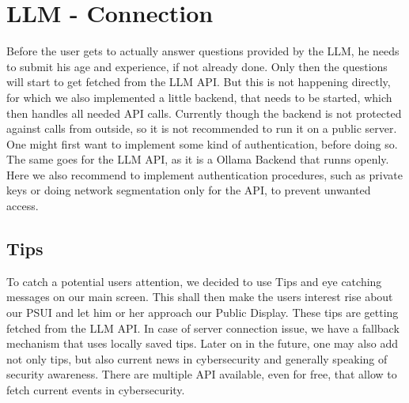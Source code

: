 \section{LLM - Connection}
Before the user gets to actually answer questions provided by the LLM, he needs to submit his age and experience, if not already done.
Only then the questions will start to get fetched from the LLM API.
But this is not happening directly, for which we also implemented a little backend, that needs to be started, which then handles all needed API calls.
Currently though the backend is not protected against calls from outside, so it is not recommended to run it on a public server.
One might first want to implement some kind of authentication, before doing so. 
The same goes for the LLM API, as it is a Ollama Backend that runns openly.
Here we also recommend to implement authentication procedures, such as private keys or doing network segmentation only for the API, to prevent unwanted access.

\subsection{Tips}
To catch a potential users attention, we decided to use Tips and eye catching messages on our main screen.
This shall then make the users interest rise about our PSUI and let him or her approach our Public Display.
These tips are getting fetched from the LLM API.
In case of server connection issue, we have a fallback mechanism that uses locally saved tips.
Later on in the future, one may also add not only tips, but also current news in cybersecurity and generally speaking of security awareness.
There are multiple API available, even for free, that allow to fetch current events in cybersecurity.


